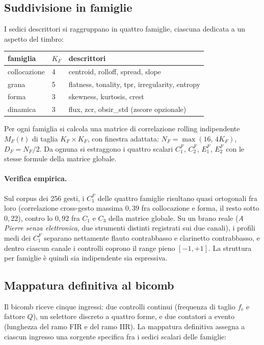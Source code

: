 \documentclass[a4paper,11pt]{article}
\begin{document}
\subsection{Suddivisione in famiglie}

I sedici descrittori si raggruppano in quattro famiglie, ciascuna
dedicata a un aspetto del timbro:

\begin{center}
\begin{tabular}{lll}
\toprule
famiglia & $K_F$ & descrittori \\
\midrule
collocazione & 4 & centroid, rolloff, spread, slope \\
grana   & 5 & flatness, tonality, tpr, irregularity, entropy \\
forma        & 3 & skewness, kurtosis, crest \\
dinamica     & 3 & flux, zcr, obsir\_std (zscore opzionale) \\
\bottomrule
\end{tabular}
\end{center}

Per ogni famiglia si calcola una matrice di correlazione rolling
indipendente $M_F(t)$ di taglia $K_F \times K_F$, con finestra adattata:
$N_F = \max(16,\, 4 K_F)$, $D_F = N_F/2$. Da ognuna si estraggono i
quattro scalari $C_1^F$, $C_2^F$, $E_1^F$, $E_2^F$ con le stesse formule
della matrice globale.

\paragraph{Verifica empirica.}
Sul corpus dei 256 gesti, i $C_1^F$ delle quattro famiglie risultano
quasi ortogonali fra loro (correlazione cross-gesto massima $0{,}39$
fra collocazione e forma, il resto sotto $0{,}22$), contro lo $0{,}92$
fra $C_1$ e $C_3$ della matrice globale. Su un brano reale
(\emph{A Pierre senza elettronica}, due strumenti distinti registrati
sui due canali), i profili medi dei $C_1^F$ separano nettamente
flauto contrabbasso e clarinetto contrabbasso, e dentro ciascun
canale i controlli coprono il range pieno $[-1, +1]$. La struttura per
famiglie è quindi sia indipendente sia espressiva.

\subsection{Mappatura definitiva al bicomb}

Il bicomb riceve cinque ingressi: due controlli continui (frequenza di
taglio $f_c$ e fattore $Q$), un selettore discreto a quattro forme, e
due contatori a evento (lunghezza del ramo FIR e del ramo IIR). La
mappatura definitiva assegna a ciascun ingresso una sorgente specifica
fra i sedici scalari delle famiglie:
\end{document}
